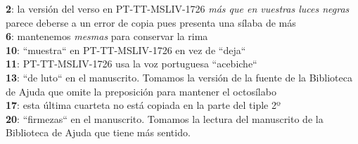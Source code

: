 \noindent \textbf{2}: la versión del verso en PT-TT-MSLIV-1726 \textit{más que en vuestras luces negras} parece deberse a un error de copia pues presenta una sílaba de más\\
\textbf{6}: mantenemos \textit{mesmas} para conservar la rima\\
\textbf{10}: ``muestra`` en PT-TT-MSLIV-1726 en vez de ``deja``\\
\textbf{11}: PT-TT-MSLIV-1726 usa la voz portuguesa ``acebiche``\\
\textbf{13}: ``de luto`` en el manuscrito. Tomamos la versión de la fuente de la Biblioteca de Ajuda que omite la preposición para mantener el octosílabo\\
\textbf{17}: esta última cuarteta no está copiada en la parte del tiple 2º\\
\textbf{20}: ``firmezas`` en el manuscrito. Tomamos la lectura del manuscrito de la Biblioteca de Ajuda que tiene más sentido.
